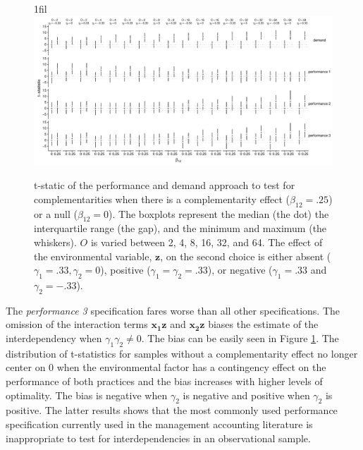 \documentclass[12pt]{article}
\makeatletter
\newcommand*{\centerfloat}{%
  \parindent \z@
  \leftskip \z@ \@plus 1fil \@minus \textwidth
  \rightskip\leftskip
  \parfillskip \z@skip}
\makeatother
\begin{document}
\begin{figure}
\centerfloat
\includegraphics[width=600px]{figure-latex/main_plot.pdf}
\caption[Error Rate and Power of Demand and Performance Specification]
{\label{main} t-static of the performance and demand approach to test
for complementarities when there is a complementarity effect ($\beta_{12} = .25$)
or a null ($\beta_{12} = 0$). The boxplots represent the median (the dot) the
interquartile range (the gap), and the minimum and maximum (the whiskers). $O$
is varied between 2, 4, 8, 16, 32, and 64. The effect of the environmental
variable, $\mathbf{z}$, on the second choice is either absent 
($\gamma_1 = .33,  \gamma_2 = 0$), positive ($\gamma_1 = \gamma_2 = .33$), or negative ($\gamma_1 = .33$ and $\gamma_2 = -.33$).}
\end{figure}


The \emph{performance 3}  specification fares worse than all other specifications. The omission of the interaction terms \(\mathbf{x_1z}\) and \(\mathbf{x_2z}\) biases the estimate of the interdependency when $\gamma_1 \gamma_2 \neq 0$. The bias can be easily seen in Figure \ref{main}. The distribution of t-statistics for samples without a complementarity effect no longer center on $0$ when the environmental factor has a contingency effect on the performance of both practices and the bias increases with higher levels of optimality. The bias is negative when $\gamma_2$ is negative and positive when $\gamma_2$ is positive.  The latter results shows that the most commonly used performance specification currently used in the management accounting literature is inappropriate to test for interdependencies in an observational sample.


\end{document}
